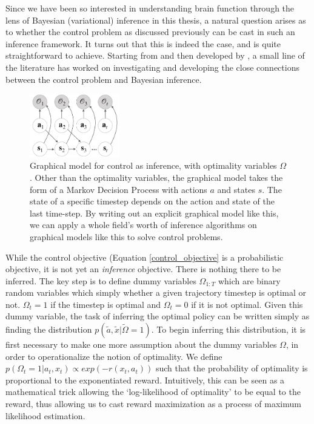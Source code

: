 Since we have been so interested in understanding brain function through the lens of Bayesian (variational) inference in this thesis, a natural question arises as to whether the control problem as discussed previously can be cast in such an inference framework. It turns out that this is indeed the case, and is quite straightforward to achieve. Starting from \citep{attias2003planning} and then developed by \citep{toussaint2006probabilistic,todorov2008general,rawlik2013probabilistic,kappen2012optimal,theodorou2010generalized,levine2018reinforcement}, a small line of the literature has worked on investigating and developing the close connections between the control problem and Bayesian inference.
\begin{figure}
    \begin{center}
          \includegraphics[width=0.35\textwidth]{chapter_4_figures/pgm.pdf}
    \end{center}
    \caption{Graphical model for control as inference, with optimality variables $\Omega$. Other than the optimality variables, the graphical model takes the form of a Markov Decision Process with actions $a$ and states $s$. The state of a specific timestep depends on the action and state of the last time-step. By writing out an explicit graphical model like this, we can apply a whole field's worth of inference algorithms on graphical models like this to solve control problems.}
\label{fig:graphical-model}
\end{figure}

While the control objective (Equation \ref{control_objective} is a probabilistic objective, it is not yet an \emph{inference} objective. There is nothing there to be inferred. The key step is to define dummy variables $\Omega_{1:T}$ which are binary random variables which simply whether a given trajectory timestep is optimal or not. $\Omega_t = 1$ if the timestep is optimal and $\Omega_t = 0$ if it is not optimal. Given this dummy variable, the task of inferring the optimal policy can be written simply as finding the distribution $p(\tilde{a}, \tilde{x} | \tilde{\Omega} = 1)$. To begin inferring this distribution, it is first necessary to make one more assumption about the dummy variables $\Omega$, in order to operationalize the notion of optimality. We define $p(\Omega_t = 1 | a_t, x_t) \propto exp(-r(x_t, a_t))$ such that the probability of optimality is proportional to the exponentiated reward. Intuitively, this can be seen as a mathematical trick allowing the `log-likelihood of optimality' to be equal to the reward, thus allowing us to cast reward maximization as a process of maximum likelihood estimation.

